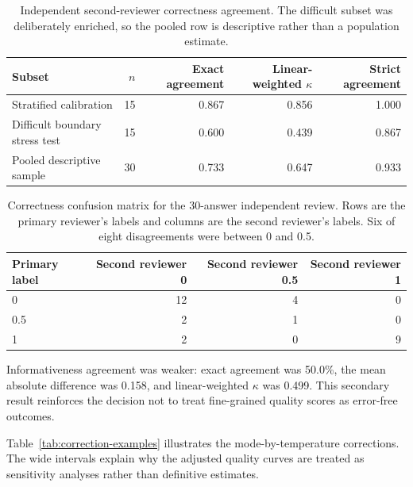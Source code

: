 \documentclass[11pt]{article}
\begin{document}
\begin{table}[ht]
\centering
\small
\caption{Independent second-reviewer correctness agreement. The difficult
subset was deliberately enriched, so the pooled row is descriptive rather
than a population estimate.}
\label{tab:second-reviewer-agreement}
\begin{tabular}{lrrrr}
\toprule
Subset & $n$ & Exact agreement & Linear-weighted $\kappa$ & Strict agreement \\
\midrule
Stratified calibration & 15 & 0.867 & 0.856 & 1.000 \\
Difficult boundary stress test & 15 & 0.600 & 0.439 & 0.867 \\
Pooled descriptive sample & 30 & 0.733 & 0.647 & 0.933 \\
\bottomrule
\end{tabular}
\end{table}

\begin{table}[ht]
\centering
\small
\caption{Correctness confusion matrix for the 30-answer independent review.
Rows are the primary reviewer's labels and columns are the second reviewer's
labels. Six of eight disagreements were between 0 and 0.5.}
\label{tab:second-reviewer-confusion}
\begin{tabular}{lrrr}
\toprule
Primary label & Second reviewer 0 & Second reviewer 0.5 & Second reviewer 1 \\
\midrule
0 & 12 & 4 & 0 \\
0.5 & 2 & 1 & 0 \\
1 & 2 & 0 & 9 \\
\bottomrule
\end{tabular}
\end{table}

Informativeness agreement was weaker: exact agreement was 50.0\%, the mean
absolute difference was 0.158, and linear-weighted $\kappa$ was 0.499. This
secondary result reinforces the decision not to treat fine-grained quality
scores as error-free outcomes.

Table~\ref{tab:correction-examples} illustrates the mode-by-temperature
corrections. The wide intervals explain why the adjusted quality curves are
treated as sensitivity analyses rather than definitive estimates.
\end{document}
